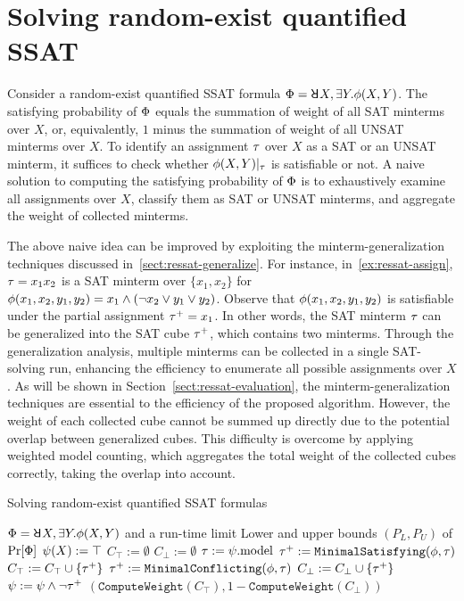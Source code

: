 \section{Solving random-exist quantified SSAT}
\label{sect:ressat-technique}

Consider a random-exist quantified SSAT formula $\Qf=\random{} X,\exists Y.\pf(X,Y)$.
The satisfying probability of $\Phi$ equals the summation of weight of all SAT minterms over $X$, or, equivalently,
$1$ minus the summation of weight of all UNSAT minterms over $X$.
To identify an assignment $\tau$ over $X$ as a SAT or an UNSAT minterm,
it suffices to check whether $\phi(X,Y)|_{\tau}$ is satisfiable or not.
A naive solution to computing the satisfying probability of $\Phi$ is to exhaustively examine all assignments over $X$, classify them as SAT or UNSAT minterms, and aggregate the weight of collected minterms.

The above naive idea can be improved by exploiting the minterm-generalization techniques discussed in~\cref{sect:ressat-generalize}.
For instance, in~\cref{ex:ressat-assign},
$\tau=x_1x_2$ is a SAT minterm over $\{x_1,x_2\}$ for $\phi(x_1,x_2,y_1,y_2)=x_1 \land (\lnot x_2 \lor y_1 \lor y_2)$.
Observe that $\phi(x_1,x_2,y_1,y_2)$ is satisfiable under the partial assignment $\tau^+=x_1$.
In other words, the SAT minterm $\tau$ can be generalized into the SAT cube $\tau^+$, which contains two minterms.
Through the generalization analysis, multiple minterms can be collected in a single SAT-solving run,
enhancing the efficiency to enumerate all possible assignments over $X$.
As will be shown in Section~\ref{sect:ressat-evaluation},
the minterm-generalization techniques are essential to the efficiency of the proposed algorithm.
However, the weight of each collected cube cannot be summed up directly due to the potential overlap between generalized cubes.
This difficulty is overcome by applying weighted model counting,
which aggregates the total weight of the collected cubes correctly, taking the overlap into account.

\begin{algorithm}[p]
    \caption{Solving random-exist quantified SSAT formulas}
    \label{alg:ressat}
    \begin{algorithmic}[1]
        \REQUIRE
        $\Qf=\random{} X,\exists Y.\pf(X,Y)$ and a run-time limit \timeout
        \ENSURE
        Lower and upper bounds $(P_L,P_U)$ of $\Pr[\Phi]$
        \STATE $\psi(X) := \top$
        \STATE $C_\top := \emptyset$
        \STATE $C_\bot := \emptyset$
        \STATE $\tau := \psi.\mathrm{model}$
        \IF{($\sat{\pcf{\pf}{\as}}$)}
        \STATE $\tau^+ := \texttt{MinimalSatisfying}(\phi,\tau)$
        \STATE $C_\top := C_\top \cup \{\tau^+\}$
        \ELSE
        \STATE $\tau^+ := \texttt{MinimalConflicting}(\phi,\tau)$
        \STATE $C_\bot := C_\bot \cup \{\tau^+\}$
        \ENDIF
        \STATE $\psi := \psi \land \lnot\tau^+$
        \ENDWHILE
        \RETURN $(\texttt{ComputeWeight}(C_\top),1-\texttt{ComputeWeight}(C_\bot))$
    \end{algorithmic}
\end{algorithm}

